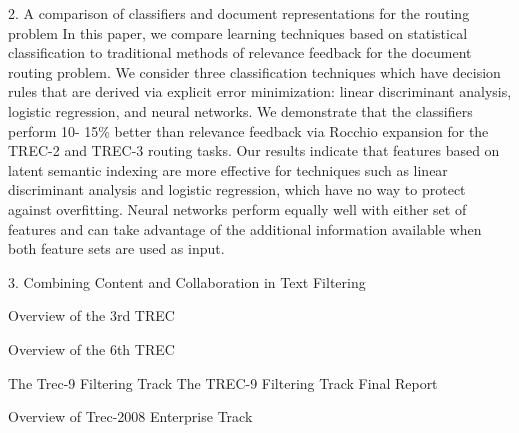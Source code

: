 \documentclass[14pt]{article}
\begin{document}
2. A comparison of classifiers and document representations for the routing problem
In this paper, we compare learning techniques based on statistical
classification to traditional methods of relevance feedback for the
document routing problem. We consider three classification techniques
which have decision rules that are derived via explicit error
minimization: linear discriminant analysis, logistic regression, and
neural networks. We demonstrate that the classifiers perform 10-
15\% better than relevance feedback via Rocchio expansion for the
TREC-2 and TREC-3 routing tasks.
Our results indicate that features based on latent semantic indexing
are more effective for techniques such as linear discriminant analysis
and logistic regression, which have no way to protect against
overfitting. Neural networks perform equally well with either set of
features and can take advantage of the additional information available
when both feature sets are used as input.

3. Combining Content and Collaboration in Text Filtering



Overview of the 3rd TREC


Overview of the 6th TREC


The Trec-9 Filtering Track
The TREC-9 Filtering Track Final Report


Overview of Trec-2008 Enterprise Track






\end{document}
